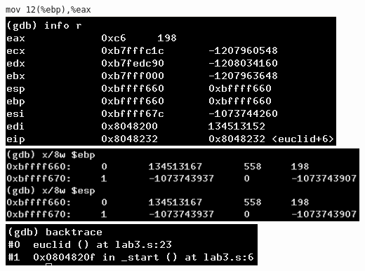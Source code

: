 \documentclass{article}
\begin{document}
\begin{minipage}{8cm}
\verb|mov 12(%ebp),%eax|\\
\includegraphics[scale=0.4]{info7.png} \\
\includegraphics[scale=0.4]{x7.png} \\
\includegraphics[scale=0.5]{bt7.png} \\
\end{minipage}
\clearpage
\end{document}
